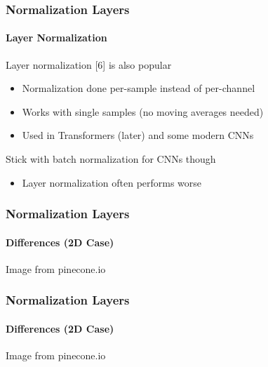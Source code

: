 \documentclass[xetex,professionalfont]{beamer}
\renewcommand\emph[1]{\textcolor{tuwcvl_cvl_blue}{#1}}
\begin{document}
  
  \begin{frame}
    \frametitle{Normalization Layers}
  \framesubtitle{Layer Normalization}
  
  \emph{Layer normalization} [6] is also popular
  \begin{itemize}
    \item Normalization done per-sample instead of per-channel %
    \item Works with single samples (no moving averages needed)
    \item Used in Transformers (later) and some modern CNNs %
\end{itemize}

\bigskip
Stick with batch normalization for CNNs though
\begin{itemize}
  \item Layer normalization often performs worse %
\end{itemize}

\end{frame}

  
  \begin{frame}
    \frametitle{Normalization Layers}
  \framesubtitle{Differences (2D Case)}
  

\begin{center}
  {\centering Image from pinecone.io}
\end{center}

\end{frame}

  
  \begin{frame}
    \frametitle{Normalization Layers}
  \framesubtitle{Differences (2D Case)}
  

\begin{center}
  {\centering Image from pinecone.io}
\end{center}

\end{frame}
\end{document}
